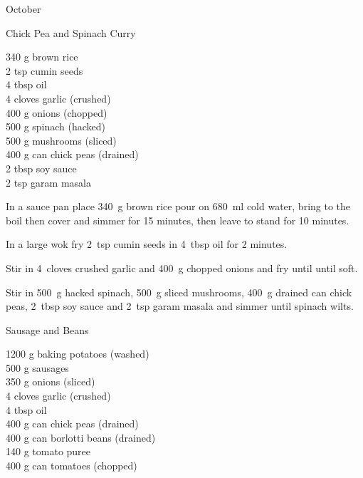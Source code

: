 \begin{menu}{October}
    \begin{recipe}{2}{Chick Pea and Spinach Curry}%
		\begin{ingredients}
		340 g brown rice  \\
	2 tsp cumin seeds  \\
	4 tbsp oil  \\
	4 cloves garlic (crushed) \\
	400 g onions (chopped) \\
	500 g spinach (hacked) \\
	500 g mushrooms (sliced) \\
	400 g can chick peas (drained) \\
	2 tbsp soy sauce  \\
	2 tsp garam masala  \\
	
		\end{ingredients}
	
	
	
    \begin{instructions}
    \item 
    In a
    sauce pan
    place
    340~g  brown rice
    pour on
    680~ml  cold water,
    bring to the boil then cover and simmer for 15 minutes,
    then leave to stand for 10 minutes.
  \item 
        In a large wok fry
        2~tsp  cumin seeds
        in
        4~tbsp  oil
        for 2 minutes.
      \item 
        Stir in
        4~cloves crushed garlic
        and
        400~g chopped onions
        and fry until until soft.
      \item 
        Stir in
        500~g hacked spinach,
        500~g sliced mushrooms,
        400~g drained can chick peas,
        2~tbsp  soy sauce
        and
        2~tsp  garam masala
        and simmer until spinach wilts.
      
    \end{instructions}
    \end{recipe}%
  
    \begin{recipe}{2}{Sausage and Beans}%
		\begin{ingredients}
		1200 g baking potatoes (washed) \\
	500 g sausages  \\
	350 g onions (sliced) \\
	4 cloves garlic (crushed) \\
	4 tbsp oil  \\
	400 g can chick peas (drained) \\
	400 g can borlotti beans (drained) \\
	140 g tomato puree  \\
	400 g can tomatoes (chopped) \\
	

\end{ingredients}
\end{recipe}
\end{menu}
